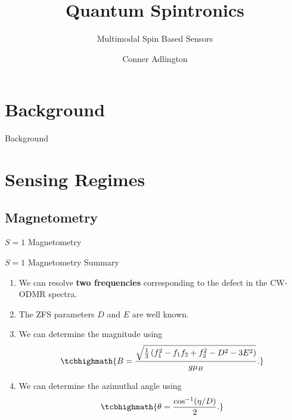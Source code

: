 \documentclass[10pt,xcolor={table,dvipsnames},c]{beamer}
\title[]{Quantum Spintronics}
\subtitle{Multimodal Spin Based Sensors}
\author{Conner Adlington}
\institute{School of Physics and Astronomy \\ University of Edinburgh}
\date{}
\begin{document}
\begin{frame}
	\titlepage
\end{frame}






\section{Background}
\begin{frame}{Background}
\end{frame}


\section{Sensing Regimes}
\subsection{Magnetometry}
\begin{frame}{$S=1$ Magnetometry}
	\begin{summary}{$S=1$ Magnetometry Summary}{}
		\small
		\begin{enumerate}
			\item We can resolve \textbf{two frequencies} corresponding to the defect in the CW-ODMR spectra.
			\item The ZFS parameters $D$ and $E$ are well known.
			\item We can determine the magnitude using
			      \begin{equation*}
				      \tcbhighmath{B = \frac{\sqrt{\frac{1}{3} \left(f_1^2 - f_1 f_2 + f_2^2 -D^2 -3E^2\right)}}{g \mu_B}.}
			      \end{equation*}
			\item We can determine the azimuthal angle using
			      \begin{equation*}
				      \tcbhighmath{
					      \theta = \frac{\cos^{-1} (\eta/D)}{2}.
				      }
			      \end{equation*}
		\end{enumerate}
	\end{summary}
\end{frame}
\end{document}
